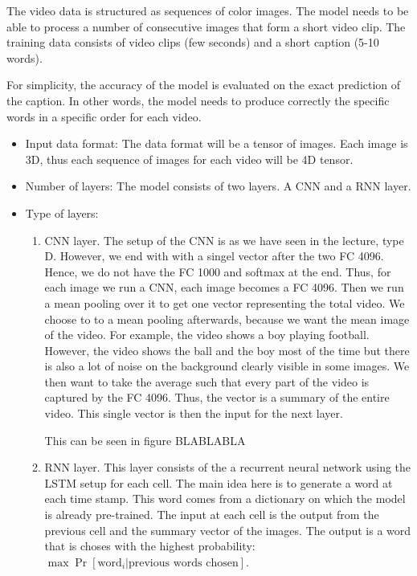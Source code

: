 \documentclass[10pt]{article}
\newcounter{rcounter}
\newenvironment{rlist}%
{\begin{list}{\setnr-\arabic{rcounter}}{\usecounter{rcounter}}}{\end{list}}
\begin{document}
\begin{rlist}
The video data is structured as sequences of color images. The model needs to be able to process a number of consecutive images that form a short video clip. The training data consists of video clips (few seconds) and a short caption (5-10 words). 

For simplicity, the accuracy of the model is evaluated on the exact prediction of the caption. In other words, the model needs to produce correctly the specific words in a specific order for each video. 


\begin{itemize}
\item Input data format: The data format will be a tensor of images. Each image is 3D, thus each sequence of images for each video will be 4D tensor. 

\item Number of layers: The model consists of two layers. A CNN and a RNN layer.

\item Type of layers: 
\begin{enumerate}
\item CNN layer. The setup of the CNN is as we have seen in the lecture, type D. However, we end with with a singel vector after the two FC 4096. Hence, we do not have the FC 1000 and softmax at the end. Thus, for each image we run a CNN, each image becomes a FC 4096. Then we run a mean pooling over it to get one vector representing the total video. We choose to to a mean pooling afterwards, because we want the mean image of the video. For example, the video shows a boy playing football. However, the video shows the ball and the boy most of the time but there is also a lot of noise on the background clearly visible in some images. We then want to take the average such that every part of the video is captured by the FC 4096. Thus, the vector is a summary of the entire video. This single vector is then the input for the next layer.

This can be seen in figure BLABLABLA

\item RNN layer. This layer consists of the a recurrent neural network using the LSTM setup for each cell. The main idea here is to generate a word at each time stamp. This word comes from a dictionary on which the model is already pre-trained. The input at each cell is the output from the previous cell and the summary vector of the images. The output is a word that is choses with the highest probability: $\max \Pr[\text{word}_i|\text{previous words chosen}]$.


\end{enumerate}
\end{itemize}
\end{rlist}
\end{document}
